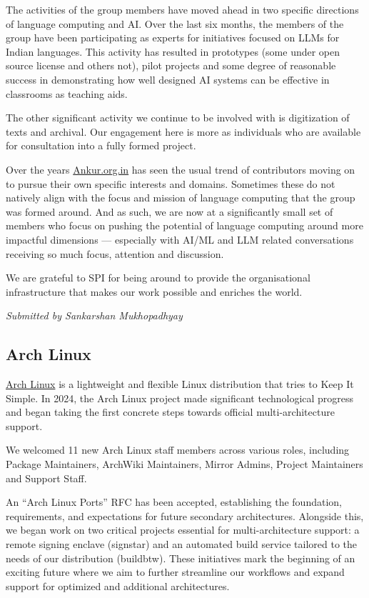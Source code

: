 \documentclass[a4paper]{report}
\begin{document}
The activities of the group members have moved ahead in two specific directions of language computing and AI. Over the last six months, the members of the group have been participating as experts for initiatives focused on LLMs for Indian languages. This activity has resulted in prototypes (some under open source license and others not), pilot projects and some degree of reasonable success in demonstrating how well designed AI systems can be effective in classrooms as teaching aids.

The other significant activity we continue to be involved with is digitization of texts and archival. Our engagement here is more as individuals who are available for consultation into a fully formed project.

Over the years \href{https://ankur.org.in/}{Ankur.org.in} has seen the usual trend of contributors moving on to pursue their own specific interests and domains. Sometimes these do not natively align with the focus and mission of language computing that the group was formed around. And as such, we are now at a significantly small set of members who focus on pushing the potential of language computing around more impactful dimensions --- especially with AI/ML and LLM related conversations receiving so much focus, attention and discussion.

We are grateful to SPI for being around to provide the organisational infrastructure that makes our work possible and enriches the world.

{\em Submitted by Sankarshan Mukhopadhyay}

\subsection{Arch Linux}

\href{https://archlinux.org/}{Arch Linux} is a lightweight and flexible Linux distribution that tries to Keep It Simple. In 2024, the Arch Linux project made significant technological progress and began taking the first concrete steps towards official multi-architecture support.

We welcomed 11 new Arch Linux staff members across various roles, including Package Maintainers, ArchWiki Maintainers, Mirror Admins, Project Maintainers and Support Staff.

An “Arch Linux Ports” RFC has been accepted, establishing the foundation, requirements, and expectations for future secondary architectures. Alongside this, we began work on two critical projects essential for multi-architecture support: a remote signing enclave (signstar) and an automated build service tailored to the needs of our distribution (buildbtw). These initiatives mark the beginning of an exciting future where we aim to further streamline our workflows and expand support for optimized and additional architectures.
\end{document}
